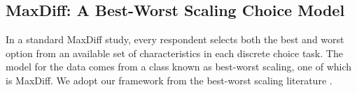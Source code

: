 \documentclass[nonblindrev]{informs3}
\begin{document}



\subsection{MaxDiff: A Best-Worst Scaling Choice Model}

In a standard MaxDiff study, every respondent selects both the best and worst option from an available set of characteristics in each discrete choice task. The model for the data comes from a class known as best-worst scaling, one of which is MaxDiff. We adopt our framework from the best-worst scaling literature \citep{marley2005some,marley2012models}. 
\end{document}
